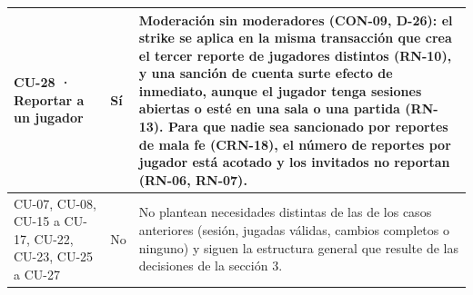 \documentclass[11pt,letterpaper]{article}
\begin{document}
\begin{xltabular}{\linewidth}{|p{4.6cm}|p{3.2cm}|Y|}
  CU-28 · Reportar a un jugador & Sí & Moderación sin moderadores (CON-09, D-26): el strike se aplica en la misma transacción que crea el tercer reporte de jugadores distintos (RN-10), y una sanción de cuenta surte efecto de inmediato, aunque el jugador tenga sesiones abiertas o esté en una sala o una partida (RN-13). Para que nadie sea sancionado por reportes de mala fe (CRN-18), el número de reportes por jugador está acotado y los invitados no reportan (RN-06, RN-07).\\\hline
  CU-07, CU-08, CU-15 a CU-17, CU-22, CU-23, CU-25 a CU-27 & No & No plantean necesidades distintas de las de los casos anteriores (sesión, jugadas válidas, cambios completos o ninguno) y siguen la estructura general que resulte de las decisiones de la sección 3.\\\hline
\end{xltabular}
\end{document}
